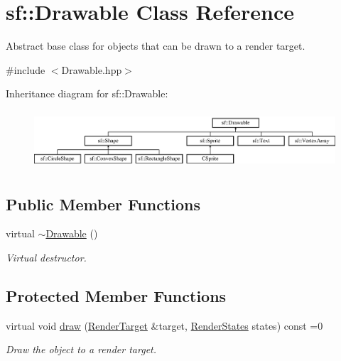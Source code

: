 \hypertarget{classsf_1_1Drawable}{\section{sf\-:\-:Drawable Class Reference}
\label{classsf_1_1Drawable}
}


Abstract base class for objects that can be drawn to a render target.  




{\ttfamily \#include $<$Drawable.\-hpp$>$}

Inheritance diagram for sf\-:\-:Drawable\-:\begin{figure}[H]
\begin{center}
\leavevmode
\includegraphics[height=2.187500cm]{classsf_1_1Drawable}
\end{center}
\end{figure}
\subsection*{Public Member Functions}
\begin{DoxyCompactItemize}
\item 
\hypertarget{classsf_1_1Drawable_a906002f2df7beb5edbddf5bbef96f120}{virtual \hyperlink{classsf_1_1Drawable_a906002f2df7beb5edbddf5bbef96f120}{$\sim$\-Drawable} ()}\label{classsf_1_1Drawable_a906002f2df7beb5edbddf5bbef96f120}

\begin{DoxyCompactList}\small\item\em Virtual destructor. \end{DoxyCompactList}\end{DoxyCompactItemize}
\subsection*{Protected Member Functions}
\begin{DoxyCompactItemize}
\item 
virtual void \hyperlink{classsf_1_1Drawable_a90d2c88bba9b035a0844eccb380ef631}{draw} (\hyperlink{classsf_1_1RenderTarget}{Render\-Target} \&target, \hyperlink{classsf_1_1RenderStates}{Render\-States} states) const =0
\begin{DoxyCompactList}\small\item\em Draw the object to a render target. \end{DoxyCompactList}\end{DoxyCompactItemize}

